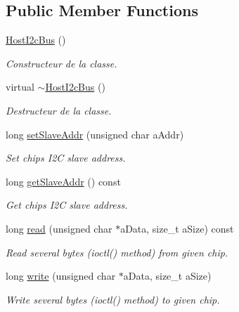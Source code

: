 \subsection*{Public Member Functions}
\begin{DoxyCompactItemize}
\item 
\mbox{\label{classHostI2cBus_a38f7715da8cd5ba19f6ef9f388d074b4}} 
\hyperlink{classHostI2cBus_a38f7715da8cd5ba19f6ef9f388d074b4}{Host\+I2c\+Bus} ()
\begin{DoxyCompactList}\small\item\em Constructeur de la classe. \end{DoxyCompactList}\item 
\mbox{\label{classHostI2cBus_a24f833a9ed74a882342725f3ef813406}} 
virtual \hyperlink{classHostI2cBus_a24f833a9ed74a882342725f3ef813406}{$\sim$\+Host\+I2c\+Bus} ()
\begin{DoxyCompactList}\small\item\em Destructeur de la classe. \end{DoxyCompactList}\item 
long \hyperlink{classHostI2cBus_ad92abe2868c75ebed518d9426e747ad0}{set\+Slave\+Addr} (unsigned char a\+Addr)
\begin{DoxyCompactList}\small\item\em Set chip\textquotesingle{}s I2C slave address. \end{DoxyCompactList}\item 
long \hyperlink{classHostI2cBus_a61dde8f92a1d4df552732d16e803934e}{get\+Slave\+Addr} () const
\begin{DoxyCompactList}\small\item\em Get chip\textquotesingle{}s I2C slave address. \end{DoxyCompactList}\item 
long \hyperlink{classHostI2cBus_adb02300bf8aacf65e169f84122848818}{read} (unsigned char $\ast$a\+Data, size\+\_\+t a\+Size) const
\begin{DoxyCompactList}\small\item\em Read several bytes (ioctl() method) from given chip. \end{DoxyCompactList}\item 
long \hyperlink{classHostI2cBus_a23f6aad4bad6aa15170f02abe1348c33}{write} (unsigned char $\ast$a\+Data, size\+\_\+t a\+Size)
\begin{DoxyCompactList}\small\item\em Write several bytes (ioctl() method) to given chip. \end{DoxyCompactList}\item 

\end{DoxyCompactItemize}

